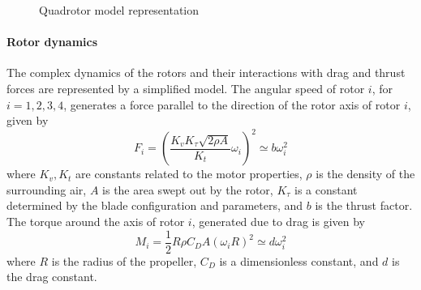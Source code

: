 \begin{figure}[h!]
	\centering
	\caption{Quadrotor model representation\label{fig:mod.model}}
\end{figure}		

\paragraph{Rotor dynamics}
The complex dynamics of the rotors and their interactions with drag and thrust forces are represented by a simplified model. 
The angular speed  of rotor $ i $, for $ i=1,2,3,4 $, generates a force  parallel to the direction of the rotor axis of rotor $ i $, given by
\begin{equation}\label{key}
F_i=\left( \frac{K_vK_\tau\sqrt{2\rho A}}{K_t}\omega_i\right)^2\simeq b\omega_i^2 
\end{equation}
where $ K_v,K_t $ are constants related to the motor properties, $ \rho $ is the density of the surrounding air, $ A $ is the area swept out by the rotor, $ K_\tau $ is a constant determined by the blade configuration and parameters, and $ b $ is the thrust factor.\\
The torque around the axis of rotor $ i $, generated due to drag is given by
\begin{equation}\label{key}
M_{i}=\frac{1}{2}R\rho C_DA(\omega_iR)^2\simeq d\omega_i^2
\end{equation}
where $ R $ is the radius of the propeller, $ C_D $ is a dimensionless constant, and $ d $ is the drag constant.

